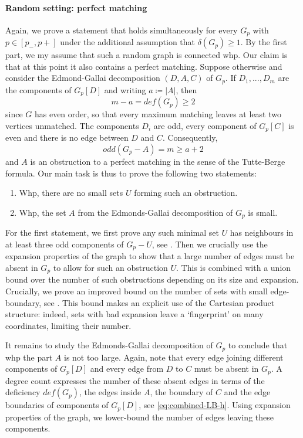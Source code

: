 \documentclass[10pt,a4paper]{article}
\begin{document}
\paragraph{Random setting: perfect matching}

Again, we prove a statement that holds simultaneously for every $G_p$ with $p \in [p_-,p+]$ under the additional assumption that $\delta(G_p) \geq 1$. By the first part, we my assume that such a random graph is connected whp. Our claim is that at this point it also contains a perfect matching. Suppose otherwise and consider the Edmond-Gallai decomposition $(D, A, C)$ of $G_p$. If $D_1, ..., D_m$ are the components of $G_p[D]$ and writing $a\coloneqq |A|$, then
\[m-a = def(G_p) \geq 2\]
since $G$ has even order, so that every maximum matching leaves at least two vertices unmatched. The components $D_i$ are odd, every component of $G_p[C]$ is even and there is no edge between $D$ and $C$. Consequently,
\[odd(G_p-A)=m \geq a+2\]
and $A$ is an obstruction to a perfect matching in the sense of the Tutte-Berge formula. Our main task is thus to prove the following two statements:

\begin{enumerate}
    \item Whp, there are no small sets $U$ forming such an obstruction.
\item Whp, the set $A$ from the Edmonds-Gallai decomposition of $G_p$ is small.
\end{enumerate}

For the first statement, we first prove any such minimal set $U$ has neighbours in at least three odd components of $G_p-U$, see . Then we crucially use the expansion properties of the graph to show that a large number of edges must be absent in $G_p$ to allow for such an obstruction $U$. This is combined with a union bound over the number of such obstructions depending on its size and expansion. Crucially, we prove an improved bound on the number of sets with small edge-boundary, see . This bound makes an explicit use of the Cartesian product structure: indeed, sets with bad expansion leave a `fingerprint' on many coordinates, limiting their number.

It remains to study the Edmonds-Gallai decomposition of $G_p$ to conclude that whp the part $A$ is not too large. Again, note that every edge joining different components of $G_p [D]$ and every edge from $D$ to $C$ must be absent in $G_p$. A degree count expresses the number of these absent edges in terms of the deficiency $def(G_p)$, the edges inside $A$, the boundary of $C$ and the edge boundaries of components of $G_p[D]$, see \eqref{eq:combined-LB-h}. Using expansion properties of the graph, we lower-bound the number of edges leaving these components.
\end{document}

